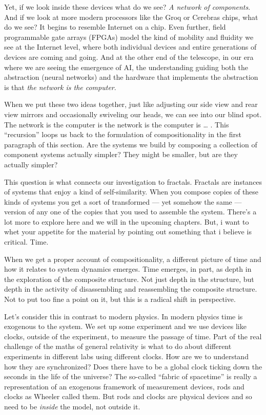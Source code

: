Yet, if we look inside these devices what do we see? \emph{A network of components}. And if we look at more modern processors like the Groq or Cerebras chips, what do we see? It begins to resemble Internet on a chip. Even further, field programmable gate arrays (FPGAs) model the kind of mobility and fluidity we see at the Internet level, where both individual devices and entire generations of devices are coming and going. And at the other end of the telescope, in our era where we are seeing the emergence of AI, the understanding guiding both the abstraction (neural networks) and the hardware that implements the abstraction is that \emph{the network is the computer}.

When we put these two ideas together, just like adjusting our side view and rear view mirrors and occasionally swiveling our heads, we can see into our blind spot. The network is the computer is the network is the computer is \ldots{} . This ``recursion'' loops us back to the formulation of compositionality in the first paragraph of this section. Are the systems we build by composing a collection of component systems actually simpler? They might be smaller, but are they actually simpler?

This question is what connects our investigation to fractals. Fractals are instances of systems that enjoy a kind of self-similarity. When you compose copies of these kinds of systems you get a sort of transformed --- yet somehow the same --- version of any one of the copies that you used to assemble the system. There's a lot more to explore here and we will in the upcoming chapters. But, i want to whet your appetite for the material by pointing out something that i believe is critical. Time. 

When we get a proper account of compositionality, a different picture of time and how it relates to system dynamics emerges. Time emerges, in part, as depth in the exploration of the composite structure. Not just depth in the structure, but depth in the activity of disassembling and reassembling the composite structure. Not to put too fine a point on it, but this is a radical shift in perspective.

Let's consider this in contrast to modern physics. In modern physics time is exogenous to the system. We set up some experiment and we use devices like clocks, outside of the experiment, to measure the passage of time. Part of the real challenge of the maths of general relativity is what to do about different experiments in different labs using different clocks. How are we to understand how they are synchronized? Does there have to be a global clock ticking down the seconds in the life of the universe? The so-called ``fabric of spacetime'' is really a representation of an exogenous framework of measurement devices, rods and clocks as Wheeler called them. But rods and clocks are physical devices and so need to be \emph{inside} the model, not outside it.

